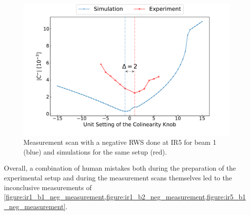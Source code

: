 \begin{figure}[!htb]
    \centering
    \includegraphics*[width=\textwidth]{Figures/Appendices/rws_measurement_ir5_b2_neg.pdf}
    \caption{Measurement scan with a negative RWS done at IR\num{5} for beam \num{1} (\textcolor{mplblue}{blue}) and simulations for the same setup (\textcolor{mplr}{red}).}
    \label{figure:ir5_b2_neg_measurement}
\end{figure}

Overall, a combination of human mistakes both during the preparation of the experimental setup and during the measurement scans themselves led to the inconclusive measurements of \cref{figure:ir1_b1_neg_measurement,figure:ir1_b2_neg_measurement,figure:ir5_b1_neg_measurement}.

\glsresetall                                     %
